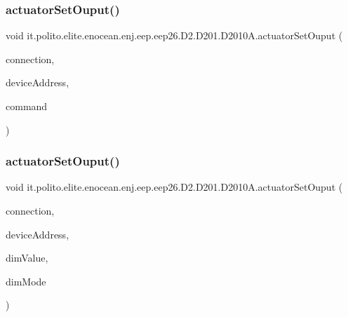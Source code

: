 \subsubsection{\texorpdfstring{actuator\+Set\+Ouput()}{actuatorSetOuput()}\hspace{0.1cm}{\footnotesize\ttfamily [1/2]}}
{\footnotesize\ttfamily void it.\+polito.\+elite.\+enocean.\+enj.\+eep.\+eep26.\+D2.\+D201.\+D2010\+A.\+actuator\+Set\+Ouput (\begin{DoxyParamCaption}\item[{\hyperlink{classit_1_1polito_1_1elite_1_1enocean_1_1enj_1_1communication_1_1_en_j_connection}{En\+J\+Connection}}]{connection,  }\item[{byte \mbox{[}$\,$\mbox{]}}]{device\+Address,  }\item[{boolean}]{command }\end{DoxyParamCaption})}

\hypertarget{classit_1_1polito_1_1elite_1_1enocean_1_1enj_1_1eep_1_1eep26_1_1_d2_1_1_d201_1_1_d2010_a_a84af35fdcb4d59cfed8a589da492653d}{}\label{classit_1_1polito_1_1elite_1_1enocean_1_1enj_1_1eep_1_1eep26_1_1_d2_1_1_d201_1_1_d2010_a_a84af35fdcb4d59cfed8a589da492653d} 
\subsubsection{\texorpdfstring{actuator\+Set\+Ouput()}{actuatorSetOuput()}\hspace{0.1cm}{\footnotesize\ttfamily [2/2]}}
{\footnotesize\ttfamily void it.\+polito.\+elite.\+enocean.\+enj.\+eep.\+eep26.\+D2.\+D201.\+D2010\+A.\+actuator\+Set\+Ouput (\begin{DoxyParamCaption}\item[{\hyperlink{classit_1_1polito_1_1elite_1_1enocean_1_1enj_1_1communication_1_1_en_j_connection}{En\+J\+Connection}}]{connection,  }\item[{byte \mbox{[}$\,$\mbox{]}}]{device\+Address,  }\item[{int}]{dim\+Value,  }\item[{\hyperlink{enumit_1_1polito_1_1elite_1_1enocean_1_1enj_1_1eep_1_1eep26_1_1_d2_1_1_d201_1_1_d201_dim_mode}{D201\+Dim\+Mode}}]{dim\+Mode }\end{DoxyParamCaption})}

